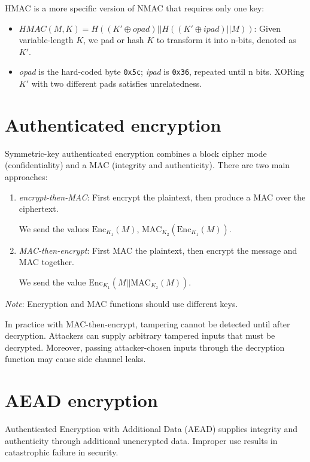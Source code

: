 \medskip

HMAC is a more specific version of NMAC that requires only one key:

\begin{itemize}
    \item $HMAC(M, K) = H((K' \oplus \textit{opad}) || H((K' \oplus \textit{ipad}) || M))$: Given variable-length $K$, we pad or hash $K$ to transform it into n-bits, denoted as $K'$.
    \item \textit{opad} is the hard-coded byte \texttt{0x5c}; \textit{ipad} is \texttt{0x36}, repeated until n bits. XORing $K'$ with two different pads satisfies unrelatedness.
\end{itemize}

\section{Authenticated encryption}
Symmetric-key authenticated encryption combines a block cipher mode (confidentiality) and a MAC (integrity and authenticity). There are two main approaches:
\begin{enumerate}
    \item \emph{encrypt-then-MAC}: First encrypt the plaintext, then produce a MAC over the ciphertext. 
    
    We send the values $\text{Enc}_{K_1}(M)$, $\text{MAC}_{K_2}(\text{Enc}_{K_1}(M))$.
    
    \item \emph{MAC-then-encrypt}: First MAC the plaintext, then encrypt the message and MAC together. 
    
    We send the value $\text{Enc}_{K_1}(M || \text{MAC}_{K_2}(M))$.
\end{enumerate}

\medskip

\emph{Note}: Encryption and MAC functions should use different keys.

\medskip

In practice with MAC-then-encrypt, tampering cannot be detected until after decryption. Attackers can supply arbitrary tampered inputs that must be decrypted. Moreover, passing attacker-chosen inputs through the decryption function may cause side channel leaks.

\section{AEAD encryption}
Authenticated Encryption with Additional Data (AEAD) supplies integrity and authenticity through additional unencrypted data. Improper use results in catastrophic failure in security.